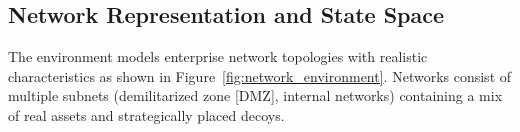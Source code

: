 \documentclass[12pt,oneside]{article}
\begin{document}
\subsection{Network Representation and State Space}

The environment models enterprise network topologies with realistic characteristics as shown in Figure~\ref{fig:network_environment}. Networks consist of multiple subnets (demilitarized zone [DMZ], internal networks) containing a mix of real assets and strategically placed decoys.

\end{document}
